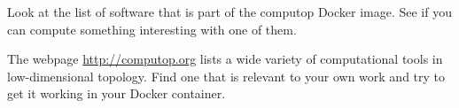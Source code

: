 \documentclass[tikz, a4paper]{nmd/hw}
\begin{document}
\begin{problems}
\item Look at the list of software that is part of the computop Docker
  image.  See if you can compute something interesting with one of them.
  
\item The webpage \url{http://computop.org} lists a wide variety of
  computational tools in low\hyp dimensional topology.  Find one that
  is relevant to your own work and try to get it working in your
  Docker container.

\end{problems}
  
\end{document}
